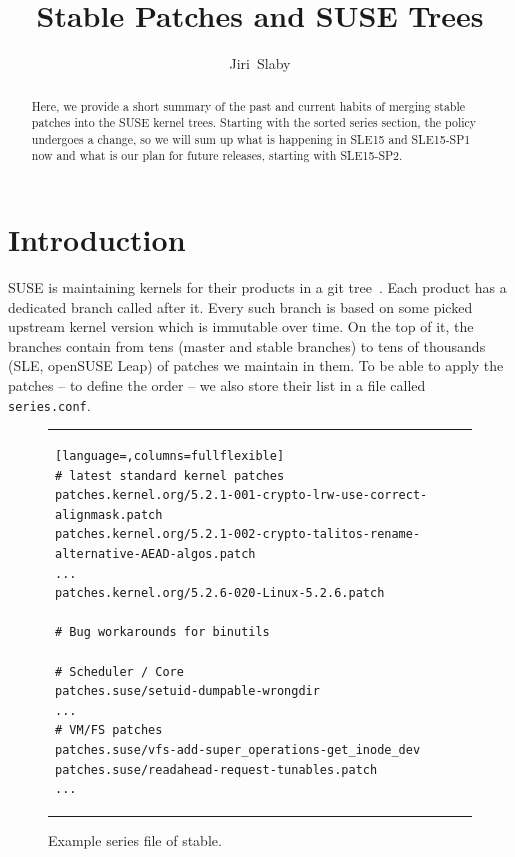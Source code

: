 \documentclass[10pt]{llncs}
\newcommand{\code}[2][]{\lstinline[columns=fullflexible, #1]$#2$}
\newcommand{\file}[2][]{\code[language={}, #1]{#2}}
\begin{document}
\title{Stable Patches and SUSE Trees}
\author{Jiri~Slaby}

\maketitle

\begin{abstract}
  Here, we provide a short summary of the past and current habits of merging
  stable patches into the SUSE kernel trees. Starting with the sorted series
  section, the policy undergoes a change, so we will sum up what is happening
  in SLE15 and SLE15-SP1 now and what is our plan for future releases,
  starting with SLE15-SP2.
\end{abstract}

\section{Introduction} \label{sec:intro}
SUSE is maintaining kernels for their products in a git tree~\cite{git_suse}.
Each product has a dedicated branch called after it. Every such branch is
based on some picked upstream kernel version which is immutable over time. On
the top of it, the branches contain from tens (master and stable branches) to
tens of thousands (SLE, openSUSE Leap) of patches we maintain in them. To be
able to apply the patches -- to define the order -- we also store their list
in a file called \file{series.conf}.

\begin{figure}[bt]
  \begin{center}
    \begin{tabular}{l}
      \begin{lstlisting}[language=,columns=fullflexible]
# latest standard kernel patches
patches.kernel.org/5.2.1-001-crypto-lrw-use-correct-alignmask.patch
patches.kernel.org/5.2.1-002-crypto-talitos-rename-alternative-AEAD-algos.patch
...
patches.kernel.org/5.2.6-020-Linux-5.2.6.patch

# Bug workarounds for binutils

# Scheduler / Core
patches.suse/setuid-dumpable-wrongdir
...
# VM/FS patches
patches.suse/vfs-add-super_operations-get_inode_dev
patches.suse/readahead-request-tunables.patch
...
      \end{lstlisting}
    \end{tabular}
  \end{center}

  \caption{Example series file of stable.}
  \label{fig:series_stable}
\end{figure}
\end{document}
